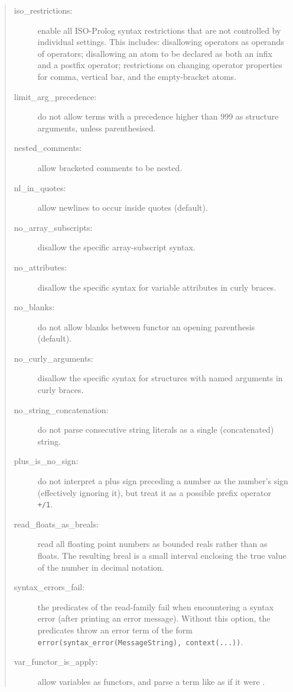 \begin{quote}
\begin{description}
\item[iso_restrictions:] 
      enable all ISO-Prolog syntax restrictions that are not controlled
      by individual settings. This includes: disallowing operators as
      operands of operators; disallowing an atom to be declared as both
      an infix and a postfix operator; restrictions on changing operator
      properties for comma, vertical bar, and the empty-bracket atoms.
\item[limit_arg_precedence:]
    do not allow terms with a precedence higher than 999 as
    structure arguments, unless parenthesised.
\item[nested_comments:] allow bracketed comments to be nested.
\item[nl_in_quotes:] allow newlines to occur inside quotes (default).
\item[no_array_subscripts:] disallow the {\eclipse} specific array-subscript
    syntax.
\item[no_attributes:] disallow the {\eclipse} specific syntax for
    variable attributes in curly braces.
\item[no_blanks:] do not allow blanks between functor an opening parenthesis
    (default).
\item[no_curly_arguments:] disallow the {\eclipse} specific syntax for
    structures with named arguments in curly braces.
\item[no_string_concatenation:] do not parse consecutive string literals
    as a single (concatenated) string.
\item[plus_is_no_sign:]
    do not interpret a plus sign preceding a number as the number's sign
    (effectively ignoring it), but treat it as a possible prefix operator
    \verb:+/1:.
\item[read_floats_as_breals:] read all floating point numbers as bounded
    reals rather than as floats. The resulting breal is a small interval
    enclosing the true value of the number in decimal notation.
\item[syntax_errors_fail:]
    the predicates of the read-family fail when encountering a
    syntax error (after printing an error message).  Without this
    option, the predicates throw an error term of the form
    \verb:error(syntax_error(MessageString), context(...)):.
\item[var_functor_is_apply:] allow variables as functors, and parse a term
    like  as if it were .
\end{description}
\end{quote}
